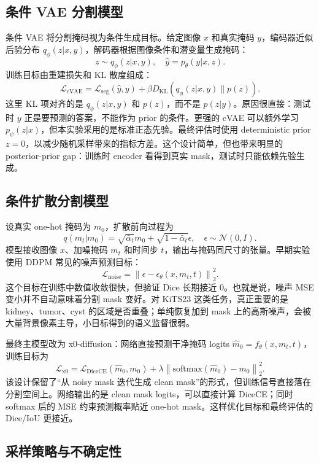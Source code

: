 \documentclass[lang=cn,11pt,a4paper]{elegantpaper}
\begin{document}
\subsection{条件 VAE 分割模型}

条件 VAE 将分割掩码视为条件生成目标。给定图像 $x$ 和真实掩码 $y$，编码器近似后验分布 $q_\phi(z|x,y)$，解码器根据图像条件和潜变量生成掩码：
\[
z \sim q_\phi(z|x,y), \quad \hat{y}=p_\theta(y|x,z).
\]
训练目标由重建损失和 KL 散度组成：
\[
\mathcal{L}_{\mathrm{cVAE}} = \mathcal{L}_{\mathrm{seg}}(\hat{y}, y)
+ \beta D_{\mathrm{KL}}\left(q_\phi(z|x,y)\|p(z)\right).
\]
这里 KL 项对齐的是 $q_\phi(z|x,y)$ 和 $p(z)$，而不是 $p(z|y)$。原因很直接：测试时 $y$ 正是要预测的答案，不能作为 prior 的条件。更强的 cVAE 可以额外学习 $p_\psi(z|x)$，但本实验采用的是标准正态先验。最终评估时使用 deterministic prior $z=0$，以减少随机采样带来的指标方差。这个设计简单，但也带来明显的 posterior-prior gap：训练时 encoder 看得到真实 mask，测试时只能依赖先验生成。

\subsection{条件扩散分割模型}

设真实 one-hot 掩码为 $m_0$，扩散前向过程为
\[
q(m_t|m_0)=\sqrt{\bar{\alpha}_t}m_0+\sqrt{1-\bar{\alpha}_t}\epsilon,\quad
\epsilon\sim\mathcal{N}(0,I).
\]
模型接收图像 $x$、加噪掩码 $m_t$ 和时间步 $t$，输出与掩码同尺寸的张量。早期实验使用 DDPM 常见的噪声预测目标：
\[
\mathcal{L}_{\mathrm{noise}} =
\left\|\epsilon-\epsilon_\theta(x,m_t,t)\right\|_2^2.
\]
这个目标在训练中数值收敛很快，但验证 Dice 长期接近 0。也就是说，噪声 MSE 变小并不自动意味着分割 mask 变好。对 KiTS23 这类任务，真正重要的是 kidney、tumor、cyst 的区域是否重叠；单纯恢复加到 mask 上的高斯噪声，会被大量背景像素主导，小目标得到的语义监督很弱。

最终主模型改为 x0-diffusion：网络直接预测干净掩码 logits $\hat{m}_0=f_\theta(x,m_t,t)$，训练目标为
\[
\mathcal{L}_{\mathrm{x0}} =
\mathcal{L}_{\mathrm{DiceCE}}(\hat{m}_0,m_0)
+ \lambda \left\|\mathrm{softmax}(\hat{m}_0)-m_0\right\|_2^2.
\]
该设计保留了“从 noisy mask 迭代生成 clean mask”的形式，但训练信号直接落在分割空间上。网络输出的是 clean mask logits，可以直接计算 DiceCE；同时 softmax 后的 MSE 约束预测概率贴近 one-hot mask。这样优化目标和最终评估的 Dice/IoU 更接近。

\subsection{采样策略与不确定性}
\end{document}

